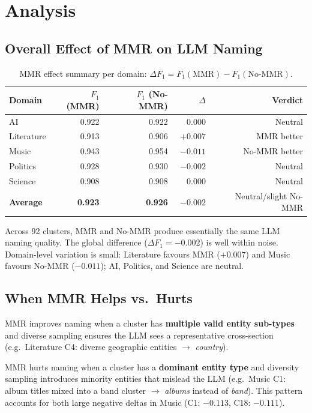 \documentclass[11pt,a4paper]{article}
\begin{document}
\section{Analysis}

\subsection{Overall Effect of MMR on LLM Naming}

\begin{table}[h]
\centering
\caption{MMR effect summary per domain: $\Delta F_1 = F_1(\text{MMR}) - F_1(\text{No-MMR})$.}
\label{tab:delta}
\small
\begin{tabular}{lrrrr}
\toprule
\textbf{Domain} & $F_1$ (MMR) & $F_1$ (No-MMR) & $\Delta$ & \textbf{Verdict} \\
\midrule
AI         & 0.922 & 0.922 & $\phantom{-}0.000$ & Neutral \\
Literature & 0.913 & 0.906 & $+0.007$ & MMR better \\
Music      & 0.943 & 0.954 & $-0.011$ & No-MMR better \\
Politics   & 0.928 & 0.930 & $-0.002$ & Neutral \\
Science    & 0.908 & 0.908 & $\phantom{-}0.000$ & Neutral \\
\midrule
\textbf{Average} & \textbf{0.923} & \textbf{0.926} & $-0.002$ & Neutral/slight No-MMR \\
\bottomrule
\end{tabular}
\end{table}

Across 92 clusters, MMR and No-MMR produce essentially the same LLM naming quality.
The global difference ($\Delta F_1 = -0.002$) is well within noise.
Domain-level variation is small: Literature favours MMR ($+0.007$) and Music favours No-MMR ($-0.011$); AI, Politics, and Science are neutral.

\subsection{When MMR Helps vs.\ Hurts}

MMR improves naming when a cluster has \textbf{multiple valid entity sub-types} and diverse sampling ensures the LLM sees a representative cross-section (e.g.\ Literature C4: diverse geographic entities $\to$ \textit{country}).

MMR hurts naming when a cluster has a \textbf{dominant entity type} and diversity sampling introduces minority entities that mislead the LLM (e.g.\ Music C1: album titles mixed into a band cluster $\to$ \textit{albums} instead of \textit{band}).
This pattern accounts for both large negative deltas in Music (C1: $-0.113$, C18: $-0.111$).
\end{document}
